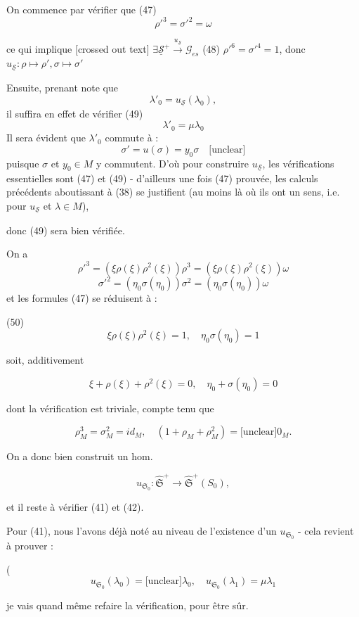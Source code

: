 On commence par vérifier que
(47) $$\rho'^3 = \sigma'^2 = \omega$$

ce qui implique [crossed out text] $\exists \underline{\mathcal{S}}^+ \xrightarrow{u_{\underline{\mathcal{S}}}} \mathcal{G}_{es}$
(48) $\rho'^6 = \sigma'^4 = 1$, donc $u_{\underline{\mathcal{S}}} : \rho \mapsto \rho', \sigma \mapsto \sigma'$

Ensuite, prenant note que
$$\lambda'_0 = u_{\underline{\mathcal{S}}}(\lambda_0),$$
il suffira en effet de vérifier
(49) $$\lambda'_0 = \mu \lambda_0$$
Il sera évident que $\lambda'_0$ commute à :
$$\sigma' = u(\sigma) = y_0 \sigma \quad \text{[unclear]}$$
puisque $\sigma$ et $y_0 \in M$ y commutent. D'où
pour construire $u_{\underline{\mathcal{S}}}$, les vérifications
essentielles sont (47) et (49) - d'ailleurs
une fois (47) prouvée, les calculs précédents
aboutissant à (38) se justifient (au moins
là où ils ont un sens, i.e. pour $u_{\underline{\mathcal{S}}}$ et $\lambda \in M$),

\newpage


donc (49) sera bien vérifiée.

On a 
$$\rho'^3 = (\xi \rho(\xi) \rho^2(\xi)) \rho^3 = (\xi \rho(\xi) \rho^2(\xi)) \omega$$
$$\sigma'^2 = (\eta_0 \sigma(\eta_0)) \sigma^2 = (\eta_0 \sigma(\eta_0)) \omega$$
et les formules (47) se réduisent à :

(50) $$ \xi \rho(\xi) \rho^2(\xi) = 1 , \quad \eta_0 \sigma(\eta_0) = 1 $$

soit, additivement

$$ \xi + \rho(\xi) + \rho^2(\xi) = 0, \quad \eta_0 + \sigma(\eta_0) = 0 $$

dont la vérification est triviale, compte tenu que

$$ \rho_M^3 = \sigma_M^2 = id_M , \quad (1 + \rho_M + \rho_M^2) = \text{[unclear]} 0_M . $$

On a donc bien construit un hom.

$$ u_{\mathfrak{S}_0} : \widehat{\mathfrak{S}}^+ \to \widehat{\mathfrak{S}}^+(S_0) , $$

et il reste à vérifier (41) et (42).

Pour (41), nous l'avons déjà noté au niveau de l'existence d'un $u_{\mathfrak{S}_0}$ - cela revient à prouver :

( $$ u_{\mathfrak{S}_0}(\lambda_0) = \text{[unclear]} \lambda_0 , \quad u_{\mathfrak{S}_0}(\lambda_1) = \mu \lambda_1 $$

je vais quand même refaire la vérification, pour être sûr.

